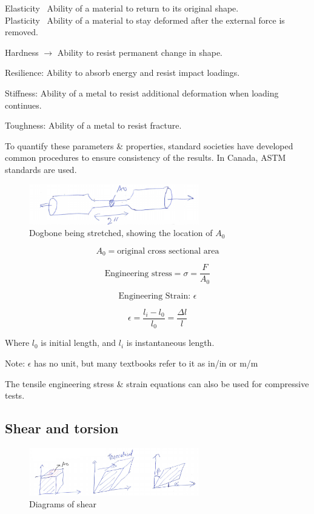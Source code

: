 \documentclass{article}
\begin{document}
Elasticity \textrightarrow\ Ability of a material to return to its original shape.\\

Plasticity \textrightarrow\ Ability of a material to stay deformed after the external force is removed.

Hardness $\rightarrow$ Ability to resist permanent change in shape.

Resilience: Ability to absorb energy and resist impact loadings.

Stiffness: Ability of a metal to resist additional deformation when loading continues.

Toughness: Ability of a metal to resist fracture.

To quantify these parameters \& properties, standard societies have developed common procedures to ensure consistency of the results. In Canada, ASTM standards are used.

\begin{figure}[h!]
	\centering
	\includegraphics[width=0.66\textwidth]{assets/12c51b4a.png}
	\caption{Dogbone being stretched, showing the location of $A_0$}
\end{figure}
\[A_0 = \text{original cross sectional area}\]

\[\textrm{Engineering stress} = \sigma = \frac{F}{A_0}\]

\[\textrm{Engineering Strain: } \epsilon\]

\[\epsilon = \frac{l_i - l_0}{l_0} = \frac{\Delta l}{l}\]

Where $l_0$ is initial length, and $l_i$ is instantaneous length.

Note: $\epsilon$ has no unit, but many textbooks refer to it as in/in or m/m

The tensile engineering stress \& strain equations can also be used for compressive tests.

\subsection{Shear and torsion}

\begin{figure}[h!]
	\centering
	\includegraphics[width=0.66\textwidth]{assets/df560772.png}
	\caption{Diagrams of shear}
\end{figure}
\end{document}
